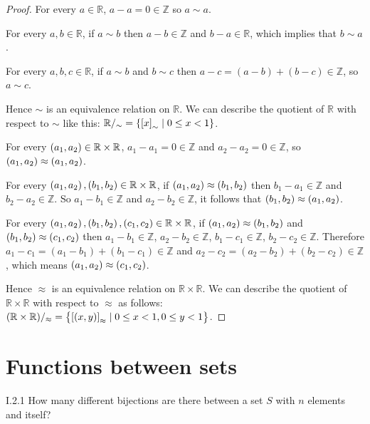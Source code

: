 \begin{proof}
	For every $a\in \mathbb{R}$, $a - a = 0 \in \mathbb{Z}$ so $a\sim a$.

	For every $a, b\in\mathbb{R}$, if $a\sim b$ then $a - b\in \mathbb{Z}$ and $b - a\in \mathbb{R}$, which implies that $b\sim a$.

	For every $a, b, c\in\mathbb{R}$, if $a\sim b$ and $b\sim c$ then $a - c = (a - b) + (b - c) \in \mathbb{Z}$, so $a\sim c$.

	Hence $\sim$ is an equivalence relation on $\mathbb{R}$. We can describe the quotient of $\mathbb{R}$ with respect to $\sim$ like this: $\mathbb{R}/_{\sim} = \left\{{{[x]}_{\sim} \mid 0\leq x < 1}\right\}$.

	\bigskip
	For every $\left({a_{1}, a_{2}}\right) \in \mathbb{R}\times\mathbb{R}$, $a_{1} - a_{1} = 0\in \mathbb{Z}$ and $a_{2} - a_{2} = 0\in \mathbb{Z}$, so $\left({a_{1}, a_{2}}\right) \approx \left({a_{1}, a_{2}}\right)$.

	For every $\left({a_{1}, a_{2}}\right), \left({b_{1}, b_{2}}\right) \in \mathbb{R}\times\mathbb{R}$, if $\left({a_{1}, a_{2}}\right) \approx \left({b_{1}, b_{2}}\right)$ then $b_{1} - a_{1}\in \mathbb{Z}$ and $b_{2} - a_{2}\in \mathbb{Z}$. So $a_{1} - b_{1}\in \mathbb{Z}$ and $a_{2} - b_{2}\in \mathbb{Z}$, it follows that $\left({b_{1}, b_{2}}\right) \approx \left({a_{1}, a_{2}}\right)$.

	For every $\left({a_{1}, a_{2}}\right), \left({b_{1}, b_{2}}\right), \left({c_{1}, c_{2}}\right) \in \mathbb{R}\times\mathbb{R}$, if $\left({a_{1}, a_{2}}\right) \approx \left({b_{1}, b_{2}}\right)$ and $\left({b_{1}, b_{2}}\right) \approx \left({c_{1}, c_{2}}\right)$ then $a_{1} - b_{1} \in \mathbb{Z}$, $a_{2} - b_{2}\in \mathbb{Z}$, $b_{1} - c_{1}\in\mathbb{Z}$, $b_{2} - c_{2}\in \mathbb{Z}$. Therefore $a_{1} - c_{1} = (a_{1} - b_{1}) + (b_{1} - c_{1}) \in \mathbb{Z}$ and $a_{2} - c_{2} = (a_{2} - b_{2}) + (b_{2} - c_{2}) \in \mathbb{Z}$, which means $\left({a_{1}, a_{2}}\right) \approx \left({c_{1}, c_{2}}\right)$.

	Hence $\approx$ is an equivalence relation on $\mathbb{R}\times\mathbb{R}$. We can describe the quotient of $\mathbb{R}\times\mathbb{R}$ with respect to $\approx$ as follows: $(\mathbb{R}\times\mathbb{R})/_{\approx} = \left\{{ {[(x, y)]}_{\approx} \mid 0 \leq x < 1, 0 \leq y < 1 }\right\}$.
\end{proof}

\section{Functions between sets}

\begin{exercise}{I.2.1}
	How many different bijections are there between a set $S$ with $n$ elements and itself?
\end{exercise}

